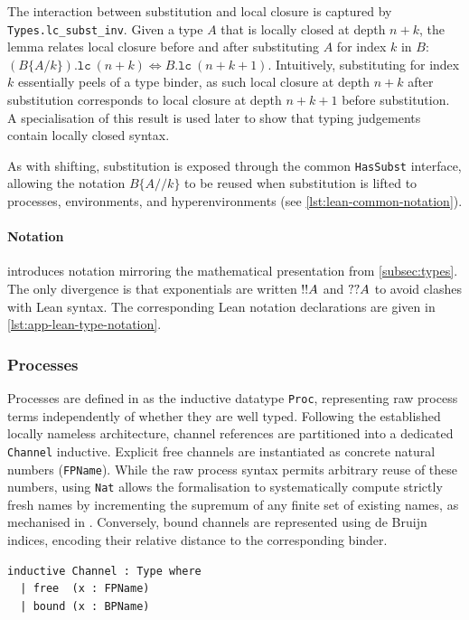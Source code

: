 The interaction between substitution and local closure is captured by \texttt{Types.lc\_subst\_inv}. Given a type $A$ that is locally closed at depth $n + k$, the lemma relates local closure before and after substituting $A$ for index $k$ in $B$: $(B\{A / k\}).\texttt{lc}~(n + k) \iff B.\texttt{lc}~(n + k + 1)$. Intuitively, substituting for index $k$ essentially peels of a type binder, as such local closure at depth $n + k$ after substitution corresponds to local closure at depth $n + k + 1$ before substitution. A specialisation of this result is used later to show that typing judgements contain locally closed syntax.

As with shifting, substitution is exposed through the common \texttt{HasSubst} interface, allowing the notation $B\{A // k\}$ to be reused when substitution is lifted to processes, environments, and hyperenvironments (see \cref{lst:lean-common-notation}).

\paragraph{Notation}  introduces notation mirroring the mathematical presentation from \cref{subsec:types}. The only divergence is that exponentials are written {$\mathord{!}\mathord{!} A$} and {$\mathord{?}\mathord{?} A$} to avoid clashes with Lean syntax. The corresponding Lean notation declarations are given in \cref{lst:app-lean-type-notation}.

\subsubsection{Processes}\label{subsubsec:processes}
Processes are defined in  as the inductive datatype \texttt{Proc}, representing raw process terms independently of whether they are well typed. Following the established locally nameless architecture, channel references are partitioned into a dedicated \texttt{Channel} inductive. Explicit free channels are instantiated as concrete natural numbers (\texttt{FPName}). While the raw process syntax permits arbitrary reuse of these numbers, using \texttt{Nat} allows the formalisation to systematically compute strictly fresh names by incrementing the supremum of any finite set of existing names, as mechanised in . Conversely, bound channels are represented using de Bruijn indices, encoding their relative distance to the corresponding binder.

\begin{lstlisting}[language=Lean4]
inductive Channel : Type where
  | free  (x : FPName)
  | bound (x : BPName)
\end{lstlisting}

